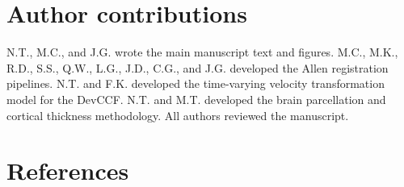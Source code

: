 \documentclass[
  12pt,
]{article}
\begin{document}
\clearpage

\section*{Author contributions}\label{author-contributions}

N.T., M.C., and J.G. wrote the main manuscript text and figures. M.C.,
M.K., R.D., S.S., Q.W., L.G., J.D., C.G., and J.G. developed the Allen
registration pipelines. N.T. and F.K. developed the time-varying
velocity transformation model for the DevCCF. N.T. and M.T. developed
the brain parcellation and cortical thickness methodology. All authors
reviewed the manuscript. \clearpage

\section*{References}\label{references}
\end{document}
